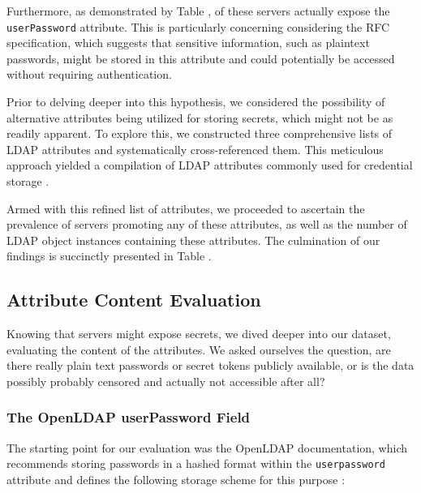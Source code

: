 Furthermore, as demonstrated by Table ,  of these servers actually expose the \texttt{userPassword} attribute. This is particularly concerning considering the RFC specification, which suggests that sensitive information, such as plaintext passwords, might be stored in this attribute and could potentially be accessed without requiring authentication.

Prior to delving deeper into this hypothesis, we considered the possibility of alternative attributes being utilized for storing secrets, which might not be as readily apparent. To explore this, we constructed three comprehensive lists of LDAP attributes and systematically cross-referenced them. This meticulous approach yielded a compilation of LDAP attributes commonly used for credential storage .

Armed with this refined list of attributes, we proceeded to ascertain the prevalence of servers promoting any of these attributes, as well as the number of LDAP object instances containing these attributes. The culmination of our findings is succinctly presented in Table .

\subsection{Attribute Content Evaluation}

Knowing that servers might expose secrets, we dived deeper into our dataset, evaluating the content of the attributes. We asked ourselves the question, are there really plain text passwords or secret tokens publicly available, or is the data possibly probably censored and actually not accessible after all?

\subsubsection{The OpenLDAP userPassword Field}

The starting point for our evaluation was the OpenLDAP documentation, which recommends storing passwords in a hashed format within the \texttt{userpassword} attribute and defines the following storage scheme for this purpose \cite{}:

